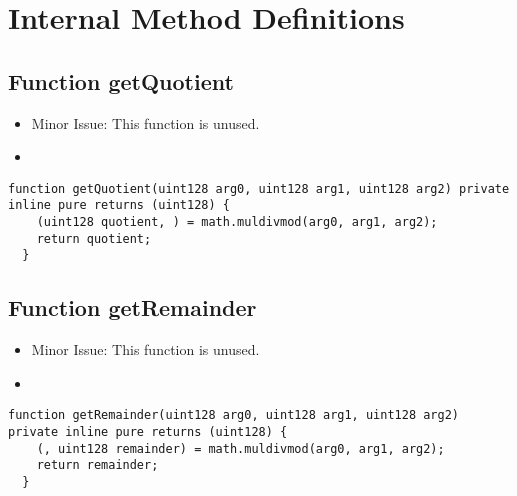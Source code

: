 \section{Internal Method Definitions}


\subsection{Function getQuotient}

\begin{itemize}
\item Minor Issue: This function is unused.
\item \issueInternal
\end{itemize}

\begin{lstlisting}[firstnumber=48]
  function getQuotient(uint128 arg0, uint128 arg1, uint128 arg2) private inline pure returns (uint128) {
    (uint128 quotient, ) = math.muldivmod(arg0, arg1, arg2);
    return quotient;
  }
\end{lstlisting}

\subsection{Function getRemainder}

\begin{itemize}
\item Minor Issue: This function is unused.
\item \issueInternal
\end{itemize}

\begin{lstlisting}[firstnumber=54]
  function getRemainder(uint128 arg0, uint128 arg1, uint128 arg2) private inline pure returns (uint128) {
    (, uint128 remainder) = math.muldivmod(arg0, arg1, arg2);
    return remainder;
  }
\end{lstlisting}
